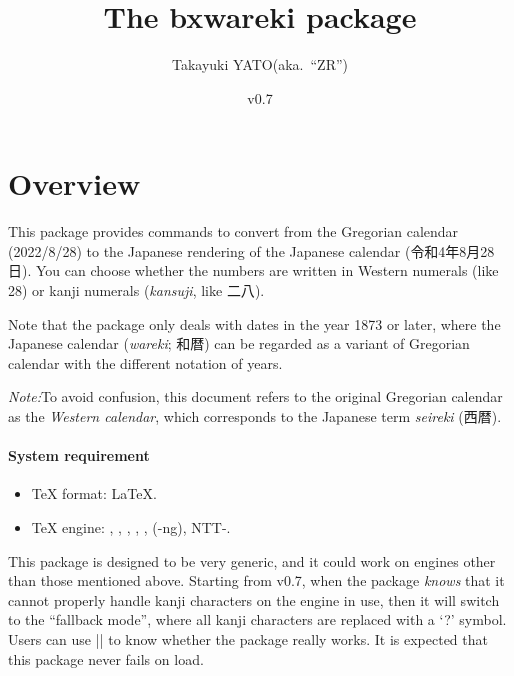 \documentclass[a4paper]{article}
\newcommand{\PkgVersion}{0.7}
\newcommand{\PkgDate}{2023/07/07}
\newcommand{\Pkg}[1]{\textsf{#1}}
\newcommand{\Note}{\par\noindent\emph{Note:}\quad}
\newcommand*{\Ja}[1]{{\fIpaex#1}}
\newcommand*{\+}{\hspace{0.25em minus 0.25em}}
\begin{document}
\title{The \Pkg{bxwareki} package}
\author{Takayuki YATO\quad (aka.~``ZR'')}
\date{v\PkgVersion \quad[\PkgDate]}
\maketitle

\section{Overview}
\label{sec:Overview}

This package provides commands to convert from the Gregorian calendar
(2022/8/28) to the Japanese rendering of the Japanese calendar
(\Ja{令和\+4\+年\+8\+月\+28\+日}).
You can choose whether the numbers are written
in Western numerals (like 28)
or kanji numerals (\emph{kansuji}, like \Ja{二八}).

Note that the package only deals with dates in the year 1873 or later,
where the Japanese calendar (\emph{wareki}; \Ja{和暦})
can be regarded as a variant of Gregorian calendar
with the different notation of years.

\Note To avoid confusion, this document refers to the original Gregorian
calendar as the \emph{Western calendar},
which corresponds to the Japanese term \emph{seireki} (\Ja{西暦}).

\paragraph{System requirement}

\begin{itemize}
\item \TeX{} format: \LaTeX.
\item \TeX{} engine: {\pdfTeX}, {\LuaTeX}, {\XeTeX},
  {\pTeX}, {\upTeX}, {\ApTeX} ({\pTeX}-ng), NTT-{\JTeX}.
\end{itemize}

This package is designed to be very generic,
and it could work on engines other than those mentioned above.
Starting from v0.7,
when the package \emph{knows} that it cannot properly handle
kanji characters on the engine in use,
then it will switch to the ``fallback mode'',
where all kanji characters are replaced with a `?' symbol.
Users can use |\WarekiIfAvailable| to know
whether the package really works.
It is expected
that this package never fails on load.

\end{document}
